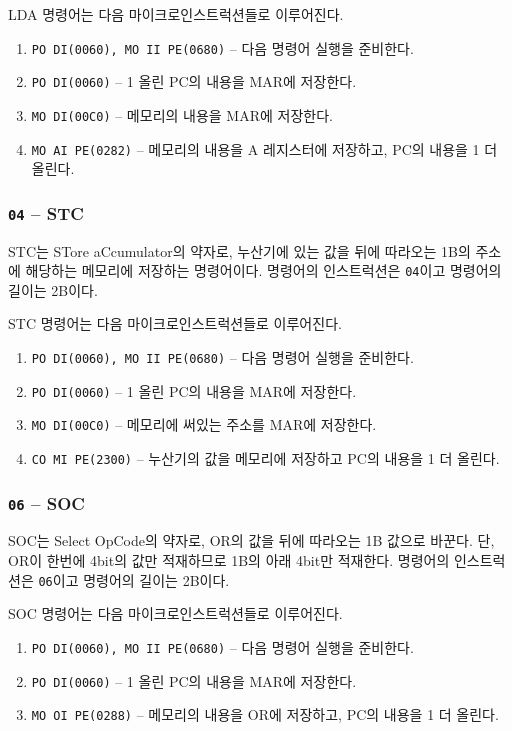 \documentclass{article}
\begin{document}
LDA 명령어는 다음 마이크로인스트럭션들로 이루어진다.

\begin{enumerate}
    \item \texttt{PO DI(0060), MO II PE(0680)} -- 다음 명령어 실행을 준비한다.
    \setcounter{enumi}{2}
    \item \texttt{PO DI(0060)} -- 1 올린 PC의 내용을 MAR에 저장한다.
    \item \texttt{MO DI(00C0)} -- 메모리의 내용을 MAR에 저장한다.
    \item \texttt{MO AI PE(0282)} -- 메모리의 내용을 A 레지스터에 저장하고,
        PC의 내용을 1 더 올린다.
\end{enumerate}

\subsubsection{\texttt{04} -- STC}

STC는 STore aCcumulator의 약자로, 누산기에 있는 값을
뒤에 따라오는 1B의 주소에 해당하는 메모리에 저장하는 명령어이다.
명령어의 인스트럭션은 \texttt{04}이고 명령어의 길이는 2B이다.

STC 명령어는 다음 마이크로인스트럭션들로 이루어진다.

\begin{enumerate}
    \item \texttt{PO DI(0060), MO II PE(0680)} -- 다음 명령어 실행을 준비한다.
    \setcounter{enumi}{2}
    \item \texttt{PO DI(0060)} -- 1 올린 PC의 내용을 MAR에 저장한다.
    \item \texttt{MO DI(00C0)} -- 메모리에 써있는 주소를 MAR에 저장한다.
    \item \texttt{CO MI PE(2300)} -- 누산기의 값을 메모리에 저장하고
        PC의 내용을 1 더 올린다.
\end{enumerate}

\subsubsection{\texttt{06} -- SOC}

SOC는 Select OpCode의 약자로, OR의 값을 뒤에 따라오는 1B 값으로 바꾼다.
단, OR이 한번에 4bit의 값만 적재하므로 1B의 아래 4bit만 적재한다.
명령어의 인스트럭션은 \texttt{06}이고 명령어의 길이는 2B이다.

SOC 명령어는 다음 마이크로인스트럭션들로 이루어진다.

\begin{enumerate}
    \item \texttt{PO DI(0060), MO II PE(0680)} -- 다음 명령어 실행을 준비한다.
    \setcounter{enumi}{2}
    \item \texttt{PO DI(0060)} -- 1 올린 PC의 내용을 MAR에 저장한다.
    \item \texttt{MO OI PE(0288)} -- 메모리의 내용을 OR에 저장하고,
        PC의 내용을 1 더 올린다.
\end{enumerate}
\end{document}
